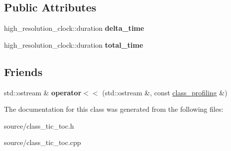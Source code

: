 \subsection*{Public Attributes}
\begin{DoxyCompactItemize}
\item 
high\+\_\+resolution\+\_\+clock\+::duration {\bfseries delta\+\_\+time}\hypertarget{classclass__profiling_a81217e33b2a51ebf11e7cdf091fecd60}{}\label{classclass__profiling_a81217e33b2a51ebf11e7cdf091fecd60}

\item 
high\+\_\+resolution\+\_\+clock\+::duration {\bfseries total\+\_\+time}\hypertarget{classclass__profiling_a2e9c567ced2cb2cba1b1c12a04009b92}{}\label{classclass__profiling_a2e9c567ced2cb2cba1b1c12a04009b92}

\end{DoxyCompactItemize}
\subsection*{Friends}
\begin{DoxyCompactItemize}
\item 
std\+::ostream \& {\bfseries operator$<$$<$} (std\+::ostream \&, const \hyperlink{classclass__profiling}{class\+\_\+profiling} \&)\hypertarget{classclass__profiling_a82f2418fd5d4d6a3db5101ed5ac50d0d}{}\label{classclass__profiling_a82f2418fd5d4d6a3db5101ed5ac50d0d}

\end{DoxyCompactItemize}


The documentation for this class was generated from the following files\+:\begin{DoxyCompactItemize}
\item 
source/class\+\_\+tic\+\_\+toc.\+h\item 
source/class\+\_\+tic\+\_\+toc.\+cpp\end{DoxyCompactItemize}
